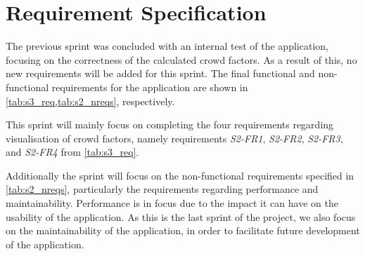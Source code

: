 \section{Requirement Specification} \label{sec:s4_reqs}
The previous sprint was concluded with an internal test of the application, focusing on the correctness of the calculated crowd factors. As a result of this, no new requirements will be added for this sprint. The final functional and non-functional requirements for the application are shown in \cref{tab:s3_req,tab:s2_nreqs}, respectively.

This sprint will mainly focus on completing the four requirements regarding visualisation of crowd factors, namely requirements \emph{S2-FR1}, \emph{S2-FR2}, \emph{S2-FR3}, and \emph{S2-FR4} from \cref{tab:s3_req}.

Additionally the sprint will focus on the non-functional requirements specified in \cref{tab:s2_nreqs}, particularly the requirements regarding performance and maintainability. Performance is in focus due to the impact it can have on the usability of the application. As this is the last sprint of the project, we also focus on the maintainability of the application, in order to facilitate future development of the application.